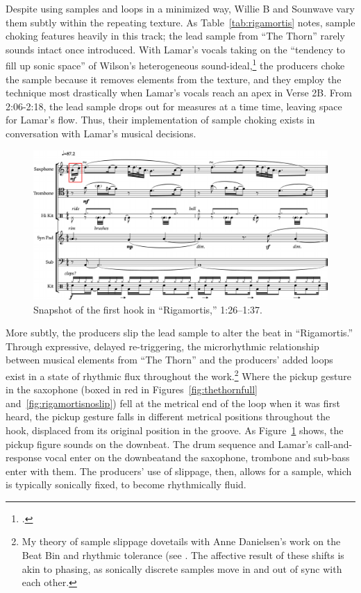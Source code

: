 Despite using samples and loops in a minimized way, Willie B and Sounwave vary them subtly
within the repeating texture. As Table~\ref{tab:rigamortis} notes, sample choking features
heavily in this track; the lead sample from ``The Thorn'' rarely sounds intact once introduced.
With Lamar's vocals taking on the ``tendency to fill up sonic space'' of Wilson's heterogeneous
sound-ideal,\footnote{
    \autocite[328]{ollywilsonHeterogeneousSoundIdeal1992}.} 
the producers choke the sample because it removes elements from the texture, and they employ
the technique most drastically when Lamar's vocals reach an apex in Verse 2B. From 2:06-2:18,
the lead sample drops out for measures at a time time, leaving space for Lamar's flow. Thus,
their implementation of sample choking exists in conversation with Lamar's musical decisions.

\begin{figure}[htp]
    \centering
    \includegraphics[width=\textwidth]{images/figures/chp 02/126137rigamortusslip.pdf}
    \caption{Snapshot of the first hook in ``Rigamortis,'' 1:26--1:37.}
    \label{fig:rigamortisslip}
\end{figure}

More subtly, the producers slip the lead sample to alter the beat in ``Rigamortis.'' Through
expressive, delayed re-triggering, the microrhythmic relationship between musical elements from
``The Thorn'' and the producers' added loops exist in a state of rhythmic flux throughout the
work.\footnote{
    My theory of sample slippage dovetails with Anne Danielsen's work on the Beat Bin and 
    rhythmic tolerance (see \autocite[29\textit{ff}.]{annedanielsenHereThereEverywhere2016}. 
    The affective result of these shifts is akin to phasing, as sonically discrete samples 
    move in and out of sync with each other.}
Where the pickup gesture in the saxophone (boxed in red in Figures~\ref{fig:thethornfull}
and~\ref{fig:rigamortisnoslip}) fell at the metrical end of the loop when it was first heard,
the pickup gesture falls in different metrical positions throughout the hook, displaced from
its original position in the groove. As Figure~\ref{fig:rigamortisslip} shows, the pickup 
figure sounds on the downbeat. The drum sequence and Lamar's call-and-response vocal enter 
on the downbeat\textemdash and the saxophone, trombone and sub-bass enter with them. The 
producers' use of slippage, then, allows for a sample, which is typically sonically fixed,
to become rhythmically fluid.

